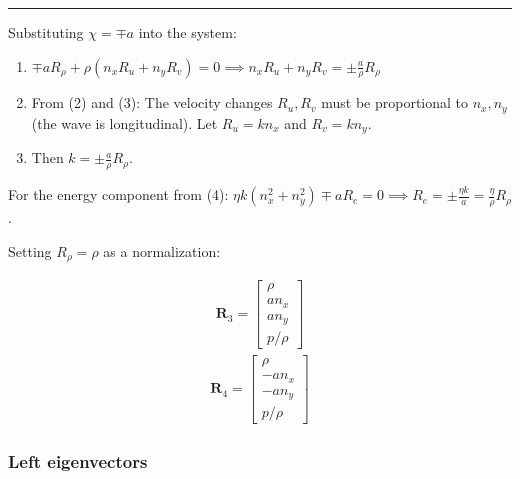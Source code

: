 \documentclass[letterpaper,10pt,english]{jupyterBook}
\begin{document}
\bigskip\hrule\bigskip


\sphinxAtStartPar
{}
Substituting \(\chi = \mp a\) into the system:
\begin{enumerate}
%
\item {} 
\sphinxAtStartPar
\(\mp a R_\rho + \rho (n_x R_u + n_y R_v) = 0 \implies n_x R_u + n_y R_v = \pm \frac{a}{\rho} R_\rho\)

\item {} 
\sphinxAtStartPar
From (2) and (3): The velocity changes \(R_u, R_v\) must be proportional to \(n_x, n_y\) (the wave is longitudinal). Let \(R_u = k n_x\) and \(R_v = k n_y\).

\item {} 
\sphinxAtStartPar
Then \(k = \pm \frac{a}{\rho} R_\rho\).

\end{enumerate}

\sphinxAtStartPar
For the energy component from (4):
\(\eta k (n_x^2 + n_y^2) \mp a R_e = 0 \implies R_e = \pm \frac{\eta k}{a} = \frac{\eta}{\rho} R_\rho\).

\sphinxAtStartPar
Setting \(R_\rho = \rho\) as a normalization:

\sphinxAtStartPar
{}
\begin{equation*}
\begin{split} \mathbf{R}_3 = \begin{bmatrix} \rho \\ a n_x \\ a n_y \\ p/\rho \end{bmatrix} \end{split}
\end{equation*}
\sphinxAtStartPar
{}
\begin{equation*}
\begin{split} \mathbf{R}_4 = \begin{bmatrix} \rho \\ -a n_x \\ -a n_y \\ p/\rho \end{bmatrix} \end{split}
\end{equation*}\subsubsection*{Left eigenvectors}
\end{document}

